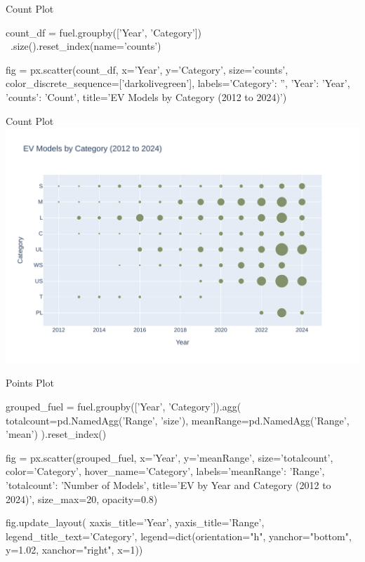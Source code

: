 \documentclass[ignorenonframetext,xcolor=x11names]{beamer}
\begin{document}
\begin{frame}[fragile]{Count Plot}
\footnotesize
\begin{pythoncode}
count_df = fuel.groupby(['Year', 'Category']) \
   .size().reset_index(name='counts')

fig = px.scatter(count_df, 
   x='Year', y='Category', size='counts',
   color_discrete_sequence=['darkolivegreen'],
   labels={'Category': '', 
           'Year': 'Year', 
           'counts': 'Count'},
   title='EV Models by Category (2012 to 2024)')
\end{pythoncode}
\end{frame}

\begin{frame}{Count Plot}
  \includegraphics[width=\textwidth]{px.fuel.count.pdf}
\end{frame}

\begin{frame}[fragile]{Points Plot}
\footnotesize
\begin{pythoncode}
grouped_fuel = fuel.groupby(['Year', 'Category']).agg(
    totalcount=pd.NamedAgg('Range', 'size'),
    meanRange=pd.NamedAgg('Range', 'mean')
).reset_index()

fig = px.scatter(grouped_fuel, 
    x='Year', y='meanRange', size='totalcount', 
    color='Category', hover_name='Category', 
    labels={'meanRange': 'Range', 
            'totalcount': 'Number of Models'},
    title='EV by Year and Category (2012 to 2024)',
    size_max=20, opacity=0.8)

fig.update_layout(
    xaxis_title='Year',
    yaxis_title='Range',
    legend_title_text='Category',
    legend=dict(orientation="h", yanchor="bottom", 
                y=1.02, xanchor="right", x=1))
\end{pythoncode}
\end{frame}
\end{document}
